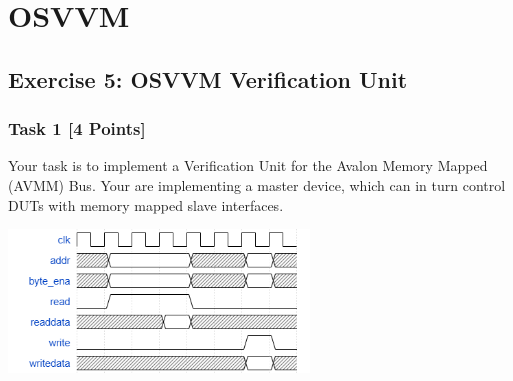 \documentclass[12pt,epsf,makeidx,oneside]{book}
\begin{document}
\chapter{OSVVM}
  \section{Exercise 5: OSVVM Verification Unit}
  \subsection{Task 1 [4 Points]}
  Your task is to implement a Verification Unit for the Avalon Memory Mapped (AVMM) Bus. Your are
  implementing a master device, which can in turn control DUTs with memory mapped slave interfaces.

  \begin{center}
    \includegraphics[width=0.6\textwidth]{avmm_timing}
  \end{center}
\end{document}
